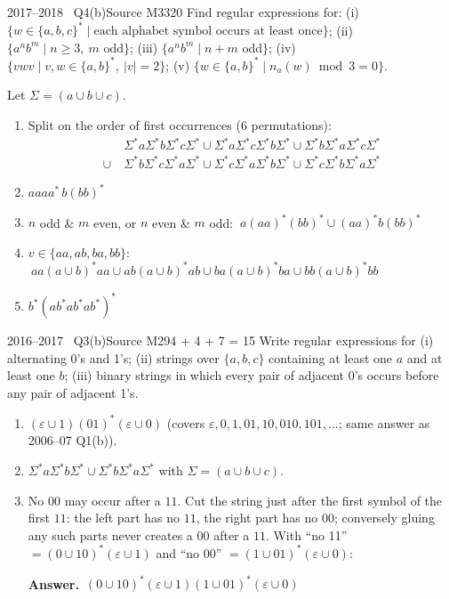 \documentclass[11pt,a4paper]{article}
\newcommand{\eps}{\varepsilon}
\newcommand{\ans}[1]{\par\smallskip\noindent\colorbox{mist}{\parbox{\dimexpr\linewidth-2\fboxsep}{\sffamily\small\textbf{\color{teal}Answer.}\ \color{ink}#1}}\par}
\begin{document}
\begin{question}{2017--2018 \textbullet\ Q4(b)}{Source M33}{20}
Find regular expressions for:
(i) $\{w\in\{a,b,c\}^*\mid \text{each alphabet symbol occurs at least once}\}$;
(ii) $\{a^nb^m\mid n\ge3,\ m \text{ odd}\}$;
(iii) $\{a^nb^m\mid n+m \text{ odd}\}$;
(iv) $\{vwv\mid v,w\in\{a,b\}^*,\ |v|=2\}$;
(v) $\{w\in\{a,b\}^*\mid n_a(w)\bmod3=0\}$.
\end{question}
\begin{solution}
Let $\Sigma=(a\cup b\cup c)$.
\begin{enumerate}
\item Split on the order of first occurrences (6 permutations):
\[\begin{aligned}&\Sigma^*a\Sigma^*b\Sigma^*c\Sigma^*\cup\Sigma^*a\Sigma^*c\Sigma^*b\Sigma^*\cup\Sigma^*b\Sigma^*a\Sigma^*c\Sigma^*\\\cup\ &\Sigma^*b\Sigma^*c\Sigma^*a\Sigma^*\cup\Sigma^*c\Sigma^*a\Sigma^*b\Sigma^*\cup\Sigma^*c\Sigma^*b\Sigma^*a\Sigma^*\end{aligned}\]
\item $aaaa^*\,b(bb)^*$
\item $n$ odd \& $m$ even, or $n$ even \& $m$ odd: $\ a(aa)^*(bb)^*\cup(aa)^*b(bb)^*$
\item $v\in\{aa,ab,ba,bb\}$: $\ aa(a\cup b)^*aa\cup ab(a\cup b)^*ab\cup ba(a\cup b)^*ba\cup bb(a\cup b)^*bb$
\item $b^*(ab^*ab^*ab^*)^*$
\end{enumerate}
\end{solution}

\begin{question}{2016--2017 \textbullet\ Q3(b)}{Source M29}{4 + 4 + 7 = 15}
Write regular expressions for (i) alternating 0's and 1's; (ii) strings over $\{a,b,c\}$ containing at least one $a$ and at least one $b$; (iii) binary strings in which every pair of adjacent 0's occurs before any pair of adjacent 1's.
\end{question}
\begin{solution}
\begin{enumerate}
\item $(\eps\cup1)(01)^*(\eps\cup0)$ \quad (covers $\eps,0,1,01,10,010,101,\dots$; same answer as 2006--07 Q1(b)).
\item $\Sigma^*a\Sigma^*b\Sigma^*\cup\Sigma^*b\Sigma^*a\Sigma^*$ with $\Sigma=(a\cup b\cup c)$.
\item No $00$ may occur after a $11$. Cut the string just after the first symbol of the first $11$: the left part has no $11$, the right part has no $00$; conversely gluing any such parts never creates a $00$ after a $11$. With ``no 11'' $=(0\cup10)^*(\eps\cup1)$ and ``no 00'' $=(1\cup01)^*(\eps\cup0)$:
\ans{$(0\cup10)^*(\eps\cup1)(1\cup01)^*(\eps\cup0)$}
\end{enumerate}
\end{solution}
\end{document}
